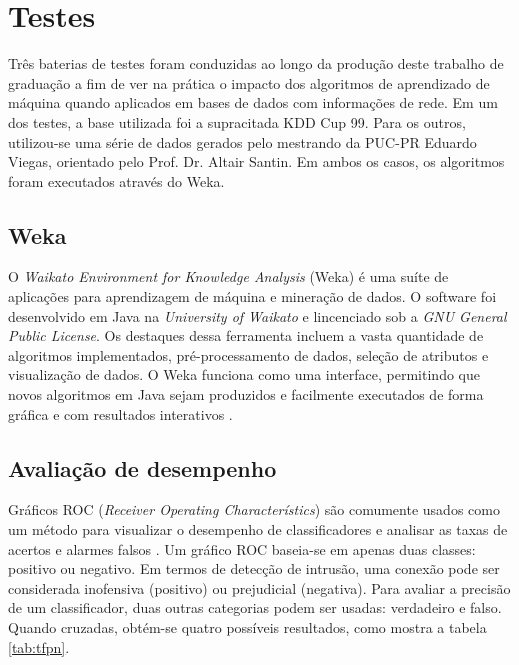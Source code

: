 \chapter{Testes}
Três baterias de testes foram conduzidas ao longo da produção deste trabalho de graduação a fim de ver na prática o
impacto dos algoritmos de aprendizado de máquina quando aplicados em bases de dados com informações de rede.
Em um dos testes, a base utilizada foi a supracitada KDD Cup 99. Para os outros, utilizou-se uma série de dados
 gerados pelo mestrando da PUC-PR Eduardo Viegas, orientado pelo Prof. Dr. Altair Santin. Em ambos os casos, os algoritmos foram
 executados através do Weka.

\section{Weka}
O \textit{Waikato Environment for Knowledge Analysis} (Weka) é uma suíte de aplicações para aprendizagem de máquina e
mineração de dados. O software foi desenvolvido em Java na \textit{University of Waikato} e lincenciado sob a
\textit{GNU General Public License}. Os destaques dessa ferramenta incluem a vasta quantidade de algoritmos
implementados, pré-processamento de dados, seleção de atributos e visualização de dados. O Weka funciona como uma
interface, permitindo que novos algoritmos em Java sejam produzidos e facilmente executados de forma gráfica e com
resultados interativos \cite{bouckaert10}.

\section{Avaliação de desempenho}
Gráficos ROC (\textit{Receiver Operating Characterístics}) são comumente usados como um método  para visualizar
o desempenho de classificadores e analisar as taxas de acertos e alarmes falsos \cite{fawcett04}. Um gráfico ROC
baseia-se em apenas duas classes: positivo ou negativo. Em termos de detecção de intrusão, uma conexão pode ser
considerada inofensiva (positivo) ou prejudicial (negativa). Para avaliar a precisão de um classificador,
duas outras categorias podem ser usadas: verdadeiro e falso. Quando cruzadas, obtém-se quatro possíveis resultados,
como mostra a tabela \ref{tab:tfpn}.

